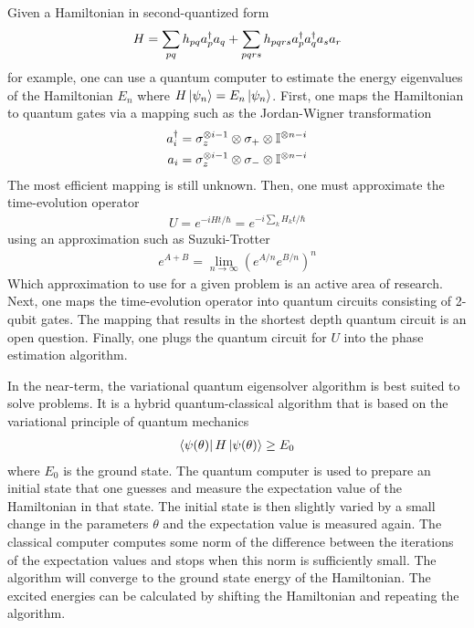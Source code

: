 \documentclass[10pt]{article}
\newcommand{\dagg}[1]{\ensuremath #1^\dag}
\begin{document}
Given a Hamiltonian in second-quantized form
\begin{align*}
H=\sum_{pq}h_{pq}\dagg{a_p}a_q+\sum_{pqrs}h_{pqrs}\dagg{a_p}\dagg{a_q}a_sa_r
\end{align*}
for example, one can use a quantum computer to estimate the energy eigenvalues of the Hamiltonian $E_n$ where $H\ket{\psi_n}=E_n\ket{\psi_n}$. First, one maps the Hamiltonian to quantum gates via a mapping such as the Jordan-Wigner transformation
\begin{align*}
\dagg{a_i}&=\sigma_z^{\otimes i-1}\otimes\sigma_+\otimes\mathbb{I}^{\otimes n-i} \\
\nonumber
a_i&=\sigma_z^{\otimes i-1}\otimes\sigma_-\otimes\mathbb{I}^{\otimes n-i}
\end{align*}
The most efficient mapping is still unknown.
Then, one must approximate the time-evolution operator
\begin{align*}
U=e^{-iHt/\hbar}=e^{-i\sum_kH_kt/\hbar}
\end{align*}
using an approximation such as Suzuki-Trotter
\begin{align*}
e^{A+B}=\lim_{n\to\infty}\left(e^{A/n}e^{B/n}\right)^n
\end{align*}
Which approximation to use for a given problem is an active area of research.
Next, one maps the time-evolution operator into quantum circuits consisting of 2-qubit gates. The mapping that results in the shortest depth quantum circuit is an open question. Finally, one plugs the quantum circuit for $U$ into the phase estimation algorithm.



In the near-term, the variational quantum eigensolver algorithm is best suited to solve problems. It is a hybrid quantum-classical algorithm that is based on the variational principle of quantum mechanics
\begin{align*}
\bra{\psi(\theta)}H\ket{\psi(\theta)}\geq E_0
\end{align*}
where $E_0$ is the ground state. The quantum computer is used to prepare an initial state that one guesses and measure the expectation value of the Hamiltonian in that state. The initial state is then slightly varied by a small change in the parameters $\theta$ and the expectation value is measured again. The classical computer computes some norm of the difference between the iterations of the expectation values and stops when this norm is sufficiently small. The algorithm will converge to the ground state energy of the Hamiltonian. The excited energies can be calculated by shifting the Hamiltonian and repeating the algorithm.
\end{document}
